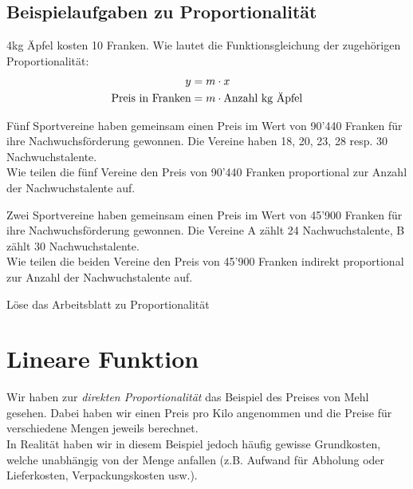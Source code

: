 \documentclass[11pt,oneside]{article}
\begin{document}
\subsection{Beispielaufgaben zu Proportionalität}
	\begin{beispiel}
		4kg Äpfel kosten 10 Franken. Wie lautet die Funktionsgleichung der zugehörigen Proportionalität:
		\begin{align*}
			y&=m\cdot x\\
			\text{Preis in Franken}&=m\cdot \text{Anzahl kg Äpfel}
		\end{align*}
	\end{beispiel}
	\begin{beispiel}
		Fünf Sportvereine haben gemeinsam einen Preis im Wert von 90'440 Franken für ihre Nachwuchsförderung gewonnen. Die Vereine haben 18, 20, 23, 28 resp. 30 Nachwuchstalente.\\
		Wie teilen die fünf Vereine den Preis von 90'440 Franken proportional zur Anzahl der Nachwuchstalente auf.
	\end{beispiel}
	\begin{beispiel}
		Zwei Sportvereine haben gemeinsam einen Preis im Wert von 45'900 Franken für ihre Nachwuchsförderung gewonnen. Die Vereine A zählt 24 Nachwuchstalente, B zählt 30 Nachwuchstalente.\\
		Wie teilen die beiden Vereine den Preis von 45'900 Franken indirekt proportional zur Anzahl der Nachwuchstalente auf.
	\end{beispiel}
	\begin{aufgabe}
		Löse das Arbeitsblatt zu Proportionalität
	\end{aufgabe}


\newpage
\section{Lineare Funktion}
	Wir haben zur \textit{direkten Proportionalität} das Beispiel des Preises von Mehl gesehen. Dabei haben wir einen Preis pro Kilo angenommen und die Preise für verschiedene Mengen jeweils berechnet. \\ In Realität haben wir in diesem Beispiel jedoch häufig gewisse Grundkosten, welche unabhängig von der Menge anfallen (z.B. Aufwand für Abholung oder Lieferkosten, Verpackungskosten usw.).\\
\end{document}
